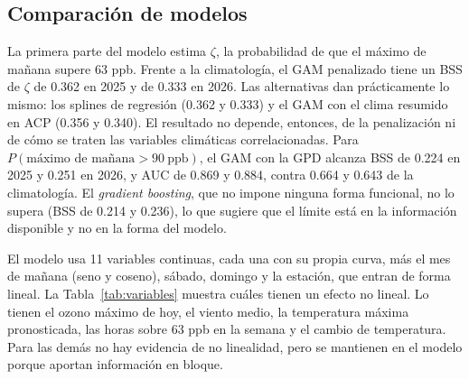 \documentclass[11pt]{article}
\begin{document}
\subsection{Comparación de modelos}
\label{sec:comparacion}
La primera parte del modelo estima $\zeta$, la probabilidad de que el máximo de mañana supere 63 ppb. Frente a la climatología, el GAM penalizado tiene un BSS de $\zeta$ de 0.362 en 2025 y de 0.333 en 2026. Las alternativas dan prácticamente lo mismo: los splines de regresión (0.362 y 0.333) y el GAM con el clima resumido en ACP (0.356 y 0.340). El resultado no depende, entonces, de la penalización ni de cómo se traten las variables climáticas correlacionadas. Para $P(\text{máximo de mañana}>90\ \text{ppb})$, el GAM con la GPD alcanza BSS de 0.224 en 2025 y 0.251 en 2026, y AUC de 0.869 y 0.884, contra 0.664 y 0.643 de la climatología. El \textit{gradient boosting}, que no impone ninguna forma funcional, no lo supera (BSS de 0.214 y 0.236), lo que sugiere que el límite está en la información disponible y no en la forma del modelo.

El modelo usa 11 variables continuas, cada una con su propia curva, más el mes de mañana (seno y coseno), sábado, domingo y la estación, que entran de forma lineal. La Tabla~\ref{tab:variables} muestra cuáles tienen un efecto no lineal. Lo tienen el ozono máximo de hoy, el viento medio, la temperatura máxima pronosticada, las horas sobre 63 ppb en la semana y el cambio de temperatura. Para las demás no hay evidencia de no linealidad, pero se mantienen en el modelo porque aportan información en bloque.
\end{document}
